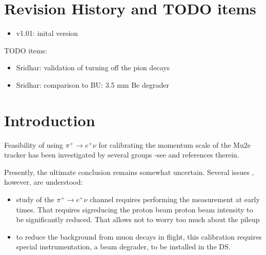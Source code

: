 \documentclass[12pt]{article}
\newcommand {\red}       {\color{red}}
\begin{document}
% 


\newpage
\section {Revision History and TODO items}

\begin{itemize}
\item
  v1.01: inital version
\end{itemize}

TODO items:

\begin{itemize}
\item
  {\red Sridhar: validation of turning off the pion decays}
\item
  {\red Sridhar: comparison to BU: 3.5 mm Be degrader}
\end{itemize}

\newpage
\section {Introduction}

Feasibility of using $\pi^+ \to e^+\nu$ for calibrating the momentum scale of the Mu2e tracker
has been investigated by several groups -see \cite{UB_NOTES, PURDUE_NOTES} and references therein.

Presently, the ultimate conclusion remains somewhat uncertain.
Several issues , however, are understood:
\begin{itemize}
\item 
  study of the $\pi^+ \to e^+\nu$ channel requires performing the measurement at early times.
  That requires sigreducing the proton beam proton beam intensity to be significantly reduced. 
  That allows not to worry too much about the pileup
\item
  to reduce the background from muon decays in flight, this calibration requires
  special instrumentation, a beam degrader, to be installed in the DS.
\end{itemize}
\end{document}

